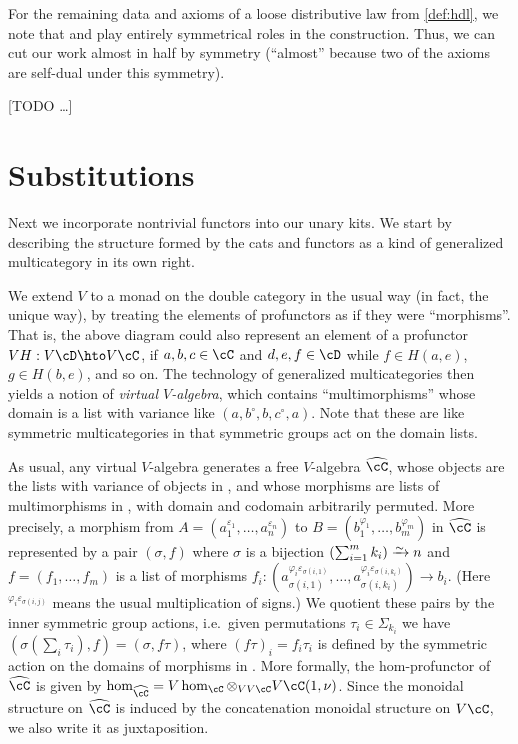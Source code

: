 \documentclass{amsart}
\newcommand{\C}{\cC}
\newcommand{\D}{\cD}
\renewcommand{\Chat}{\ensuremath{\widehat{\C}}\xspace}
\newcommand{\Tmult}{\nu}
\renewcommand{\o}{^{\circ}}
\newcommand{\e}[1][]{^{\varepsilon_{#1}}}
\renewcommand{\ph}[1][]{^{\varphi_{#1}}}
\newcommand{\phe}[2]{^{\varphi_{#1}\varepsilon_{#2}}}
\begin{document}
For the remaining data and axioms of a loose distributive law from \cref{def:hdl}, we note that \dT and \dS play entirely symmetrical roles in the construction.
Thus, we can cut our work almost in half by symmetry (``almost'' because two of the axioms are self-dual under this symmetry).

[TODO \dots]


\section{Substitutions}
\label{sec:substitutions}

Next we incorporate nontrivial functors into our unary kits.
We start by describing the structure formed by the cats and functors as a kind of generalized multicategory in its own right.

We extend $V$ to a monad on the double category \dCat in the usual way (in fact, the unique way), by treating the elements of profunctors as if they were ``morphisms''.
That is, the above diagram could also represent an element of a profunctor $V H : V \D \hto V \C$, if $a,b,c\in\C$ and $d,e,f\in \D$ while $f\in H(a,e)$, $g\in H(b,e)$, and so on.
The technology of generalized multicategories then yields a notion of \emph{virtual $V$-algebra}, which contains ``multimorphisms'' whose domain is a list with variance like $(a,b\o,b,c\o,a)$.
Note that these are like symmetric multicategories in that symmetric groups act on the domain lists.

As usual, any virtual $V$-algebra \C generates a free $V$-algebra \Chat, whose objects are the lists with variance of objects in \C, and whose morphisms are lists of multimorphisms in \C, with domain and codomain arbitrarily permuted.
More precisely, a morphism from $A=(a_1\e[1],\dots,a_n\e[n])$ to $B=(b_1\ph[1],\dots,b_m\ph[m])$ in \Chat is represented by a pair $(\sigma,f)$ where $\sigma$ is a bijection $\left(\sum_{i=1}^m k_i\right) \toiso n$ and $f=(f_1,\dots,f_m)$ is a list of morphisms $f_i:(a_{\sigma(i,1)}\phe{i}{\sigma(i,1)},\dots,a_{\sigma(i,k_i)}\phe{i}{\sigma(i,k_i)}) \to b_i$.
(Here $\phe{i}{\sigma(i,j)}$ means the usual multiplication of signs.)
We quotient these pairs by the inner symmetric group actions, i.e.\ given permutations $\tau_i\in\Sigma_{k_i}$ we have $(\sigma(\sum_i \tau_i), f) = (\sigma,f\tau)$, where $(f\tau)_i = f_i \tau_i$ is defined by the symmetric action on the domains of morphisms in \C.
More formally, the hom-profunctor of \Chat is given by $\hom_{\Chat} = V\hom_\C \otimes_{VV\C} V\C(1,\Tmult)$.
Since the monoidal structure on \Chat is induced by the concatenation monoidal structure on $V\C$, we also write it as juxtaposition.
\end{document}
